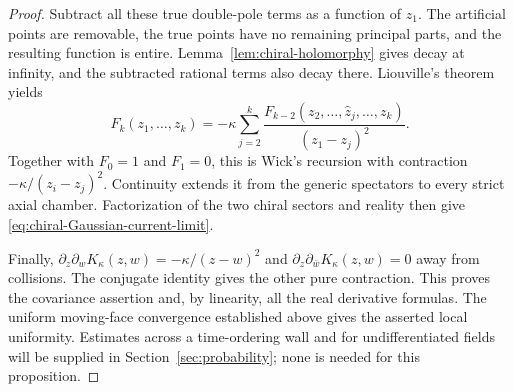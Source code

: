 \begin{proof}
Subtract all these true double-pole terms as a function of $z_1$.
The artificial points are removable, the true points have no remaining
principal parts, and the resulting function is entire.
Lemma~\ref{lem:chiral-holomorphy} gives decay at infinity, and the
subtracted rational terms also decay there. Liouville's theorem yields
\begin{equation}\label{eq:chiral-Wick-recursion}
 F_k(z_1,\ldots,z_k)
   =-\kappa\sum_{j=2}^k
       \frac{F_{k-2}(z_2,\ldots,\widehat z_j,\ldots,z_k)}
                           {(z_1-z_j)^2}.
\end{equation}
Together with $F_0=1$ and $F_1=0$, this is Wick's recursion with
contraction $-\kappa/(z_i-z_j)^2$. Continuity extends it from the
generic spectators to every strict axial chamber. Factorization of
the two chiral sectors and reality then give
\eqref{eq:chiral-Gaussian-current-limit}.

Finally,
$\partial_z\partial_w K_\kappa(z,w)=-\kappa/(z-w)^2$ and
$\partial_z\partial_{\bar w}K_\kappa(z,w)=0$ away from collisions.
The conjugate identity gives the other pure contraction. This proves
the covariance assertion and, by linearity, all the real derivative
formulas. The uniform moving-face convergence established above gives
the asserted local uniformity. Estimates across a time-ordering wall
and for undifferentiated fields will be supplied in
Section~\ref{sec:probability}; none is needed for this proposition.
\end{proof}
